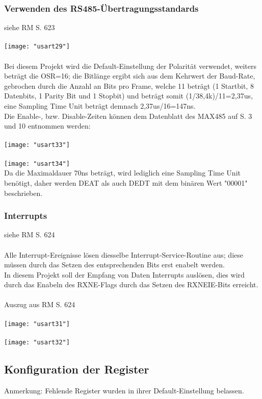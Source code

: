 \documentclass[11pt]{report}
\begin{document}
			\subsubsection{Verwenden des RS485-Übertragungsstandards}
				siehe RM S. 623\\
				\\\texttt{[image: "usart29"]}\\
				\\Bei diesem Projekt wird die Default-Einstellung der Polarität verwendet, weiters beträgt die OSR=16; die Bitlänge ergibt sich aus dem Kehrwert der Baud-Rate, gebrochen durch die Anzahl an Bits pro Frame, welche 11 beträgt (1 Startbit, 8 Datenbits, 1 Parity Bit und 1 Stopbit) und beträgt somit (1/38,4k)/11=2,37us, eine Sampling Time Unit beträgt demnach 2,37us/16=147ns.\\
				Die Enable-, bzw. Disable-Zeiten können dem Datenblatt des MAX485 auf S. 3 und 10 entnommen werden:\\
				\\\texttt{[image: "usart33"]}\\
				\\\texttt{[image: "usart34"]}\\
				Da die Maximaldauer 70ns beträgt, wird lediglich eine Sampling Time Unit benötigt, daher werden DEAT als auch DEDT mit dem binären Wert "00001" beschrieben.
			\subsubsection{Interrupts}
				siehe RM S. 624\\
				\\Alle Interrupt-Ereignisse lösen diesselbe Interrupt-Service-Routine aus; diese müssen durch das Setzen des entsprechenden Bits erst enabelt werden.\\
				In diesem Projekt soll der Empfang von Daten Interrupts auslösen, dies wird durch das Enabeln des RXNE-Flags durch das Setzen des RXNEIE-Bits erreicht.\\
				\\Auszug aus RM S. 624\\
				\\\texttt{[image: "usart31"]}\\
				\\\texttt{[image: "usart32"]}
		\subsection{Konfiguration der Register}
			Anmerkung: Fehlende Register wurden in ihrer Default-Einstellung belassen.
\end{document}
